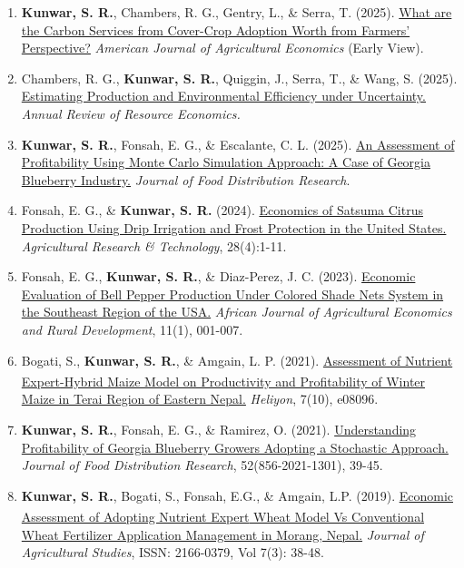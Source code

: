 \begin{enumerate}[leftmargin=1.5em]
\item \textbf{Kunwar, S. R.}, Chambers, R. G., Gentry, L., \& Serra, T. (2025). \href{https://doi.org/10.1111/ajae.70005}{What are the Carbon Services from Cover-Crop Adoption Worth from Farmers' Perspective?} \textit{American Journal of Agricultural Economics} (Early View).

\item Chambers, R. G., \textbf{Kunwar, S. R.}, Quiggin, J., Serra, T., \& Wang, S. (2025). \href{https://doi.org/10.1146/annurev-resource-121523-015001}{Estimating Production and Environmental Efficiency under Uncertainty.} \textit{Annual Review of Resource Economics.}

\item \textbf{Kunwar, S. R.}, Fonsah, E. G., \& Escalante, C. L. (2025). \href{https://www.fdrsinc.org/wp-content/uploads/2025/04/JFDR56.1_0b_Full_issue.pdf#page=31}{An Assessment of Profitability Using Monte Carlo Simulation Approach: A Case of Georgia Blueberry Industry.} \textit{Journal of Food Distribution Research}.

\item Fonsah, E. G., \& \textbf{Kunwar, S. R.} (2024). \href{https://juniperpublishers.com/artoaj/pdf/ARTOAJ.MS.ID.556416.pdf}{Economics of Satsuma Citrus Production Using Drip Irrigation and Frost Protection in the United States.} \textit{Agricultural Research \& Technology}, 28(4):1-11.

\item Fonsah, E. G., \textbf{Kunwar, S. R.}, \& Diaz-Perez, J. C. (2023). \href{https://internationalscholarsjournals.org/articles/7533205004012023}{Economic Evaluation of Bell Pepper Production Under Colored Shade Nets System in the Southeast Region of the USA.} \textit{African Journal of Agricultural Economics and Rural Development}, 11(1), 001-007.
    
\item Bogati, S., \textbf{Kunwar, S. R.}, \& Amgain, L. P. (2021). \href{https://doi.org/10.1016/j.heliyon.2021.e08096}{Assessment of Nutrient Expert\textsuperscript{\textregistered}-Hybrid Maize Model on Productivity and Profitability of Winter Maize in Terai Region of Eastern Nepal.} \textit{Heliyon}, 7(10), e08096.

\item \textbf{Kunwar, S. R.}, Fonsah, E. G., \& Ramirez, O. (2021). \href{https://doi.org/10.22004/ag.econ.313450}{Understanding Profitability of Georgia Blueberry Growers Adopting a Stochastic Approach.} \textit{Journal of Food Distribution Research}, 52(856-2021-1301), 39-45.
    
\item \textbf{Kunwar, S. R.}, Bogati, S., Fonsah, E.G., \& Amgain, L.P. (2019). \href{https://doi.org/10.5296/jas.v7i3.14900}{Economic Assessment of Adopting Nutrient Expert\textsuperscript{\textregistered} Wheat Model Vs Conventional Wheat Fertilizer Application Management in Morang, Nepal.} \textit{Journal of Agricultural Studies}, ISSN: 2166-0379, Vol 7(3): 38-48.

\end{enumerate}

